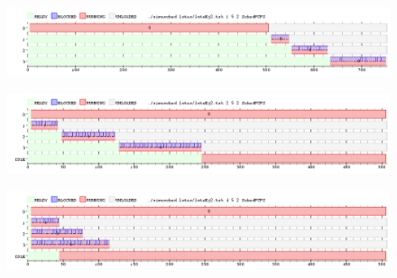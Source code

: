 \begin{figure}[H]
  \centering
  \includegraphics[width=1\textwidth]{img/imgEj2-1}
  \caption{}
  \label{fig:ej2-1}
\end{figure}

\begin{figure}[H]
  \centering
  \includegraphics[width=1\textwidth]{img/imgEj2-2}
  \caption{}
  \label{fig:ej2-2}
\end{figure}

\begin{figure}[H]
  \centering
  \includegraphics[width=1\textwidth]{img/imgEj2-3}
  \caption{}
  \label{fig:ej2-3}
\end{figure}